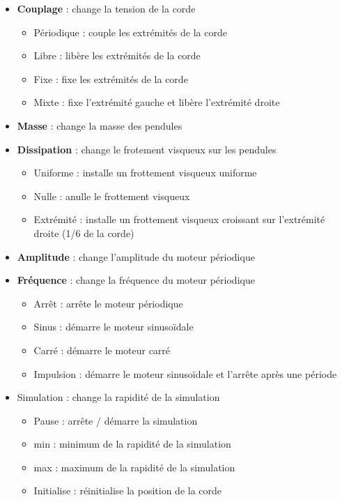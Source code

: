 \begin{itemize}[leftmargin=1cm, label=, itemsep=0pt]
	\item {\bf Couplage} : change la tension de la corde
	\begin{itemize}[leftmargin=1cm, label=, itemsep=0pt]
		\item Périodique : couple les extrémités de la corde
		\item Libre : libère les extrémités de la corde
		\item Fixe : fixe les extrémités de la corde
		\item Mixte : fixe l'extrémité gauche et libère l'extrémité droite
	\end{itemize}
	\item {\bf Masse} : change la masse des pendules
	\item {\bf Dissipation} : change le frotement visqueux sur les pendules
	\begin{itemize}[leftmargin=1cm, label=, itemsep=0pt]
		\item Uniforme : installe un frottement visqueux uniforme
		\item Nulle : anulle le frottement visqueux
		\item Extrémité : installe un frottement visqueux croissant sur l'extrémité droite (1/6 de la corde)
	\end{itemize}
	\item {\bf Amplitude} : change l'amplitude du moteur périodique
	\item {\bf Fréquence} : change la fréquence du moteur périodique
	\begin{itemize}[leftmargin=1cm, label=, itemsep=0pt]
		\item Arrêt : arrête le moteur périodique
		\item Sinus : démarre le moteur sinusoïdale
		\item Carré : démarre le moteur carré
		\item Impulsion : démarre le moteur sinusoïdale et l'arrête après une période
	\end{itemize}
	\item Simulation : change la rapidité de la simulation
	\begin{itemize}[leftmargin=1cm, label=, itemsep=0pt]
		\item Pause : arrête / démarre la simulation
		\item min : minimum de la rapidité de la simulation
		\item max : maximum de la rapidité de la simulation
	\end{itemize}
	\begin{itemize}[leftmargin=1cm, label=, itemsep=0pt]
		\item Initialise : réinitialise la position de la corde
	\end{itemize}
\end{itemize}
%
%
